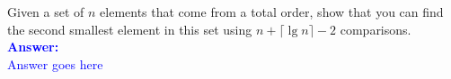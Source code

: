 \item{}
Given a set of $n$ elements that come from a total order, show that you can find
the second smallest element in this set using $n+\lceil\lg n\rceil-2$
comparisons.\\[12pt]
\ifanswers
\textcolor{blue}{
\textbf{Answer:}\\[6pt]
Answer goes here
}
\newpage
\fi
